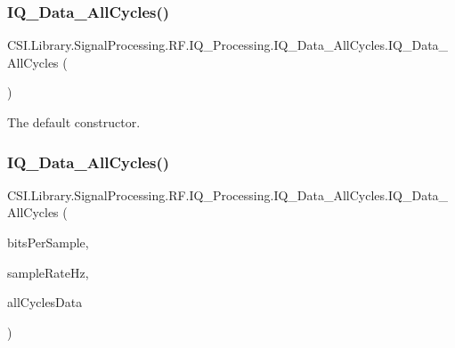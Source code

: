 \subsubsection{\texorpdfstring{IQ\_Data\_AllCycles()}{IQ\_Data\_AllCycles()}\hspace{0.1cm}{\footnotesize\ttfamily [1/3]}}
{\footnotesize\ttfamily C\+S\+I.\+Library.\+Signal\+Processing.\+R\+F.\+I\+Q\+\_\+\+Processing.\+I\+Q\+\_\+\+Data\+\_\+\+All\+Cycles.\+I\+Q\+\_\+\+Data\+\_\+\+All\+Cycles (\begin{DoxyParamCaption}{ }\end{DoxyParamCaption})\hspace{0.3cm}{\ttfamily [inline]}}



The default constructor. 

\mbox{\label{class_c_s_i_1_1_library_1_1_signal_processing_1_1_r_f_1_1_i_q___processing_1_1_i_q___data___all_cycles_a9ddb0cf4fc1e79a04dada037093f9404}} 
\subsubsection{\texorpdfstring{IQ\_Data\_AllCycles()}{IQ\_Data\_AllCycles()}\hspace{0.1cm}{\footnotesize\ttfamily [2/3]}}
{\footnotesize\ttfamily C\+S\+I.\+Library.\+Signal\+Processing.\+R\+F.\+I\+Q\+\_\+\+Processing.\+I\+Q\+\_\+\+Data\+\_\+\+All\+Cycles.\+I\+Q\+\_\+\+Data\+\_\+\+All\+Cycles (\begin{DoxyParamCaption}\item[{int}]{bits\+Per\+Sample,  }\item[{double}]{sample\+Rate\+Hz,  }\item[{\mbox{\hyperlink{class_c_s_i_1_1_library_1_1_signal_processing_1_1_r_f_1_1_i_q___processing_1_1_i_q___data___one_cycle}{I\+Q\+\_\+\+Data\+\_\+\+One\+Cycle}} \mbox{[}$\,$\mbox{]}}]{all\+Cycles\+Data }\end{DoxyParamCaption})\hspace{0.3cm}{\ttfamily [inline]}}



